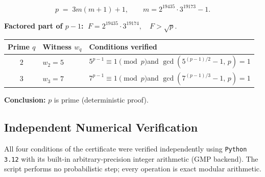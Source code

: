 \begin{resultbox}[title={\textbf{Certificate} — 29\,998-digit prime}]
\[
  p \;=\; 3m(m+1)+1,\qquad m = 2^{19435}\cdot 3^{19173}-1.
\]

\medskip
\noindent\textbf{Factored part of $p-1$:}
$\;F = 2^{19435}\cdot 3^{19174},\quad F > \sqrt{p}.\quad$\checkmark

\medskip
\renewcommand{\arraystretch}{1.4}
\begin{tabular}{@{}c l l@{}}
\toprule
Prime $q$ & Witness $w_q$ & Conditions verified \\
\midrule
$2$ & $w_2 = 5$ &
  $5^{p-1}\equiv 1\pmod{p}$\quad and\quad
  $\gcd(5^{(p-1)/2}-1,\,p)=1$ \\
$3$ & $w_3 = 7$ &
  $7^{p-1}\equiv 1\pmod{p}$\quad and\quad
  $\gcd(7^{(p-1)/3}-1,\,p)=1$ \\
\bottomrule
\end{tabular}

\medskip
\noindent\textbf{Conclusion:} $p$ is prime (deterministic proof). \checkmark
\end{resultbox}

\subsection{Independent Numerical Verification}

All four conditions of the certificate were verified independently using
\texttt{Python 3.12} with its built-in arbitrary-precision integer
arithmetic (GMP backend). The script performs no probabilistic step;
every operation is exact modular arithmetic.

